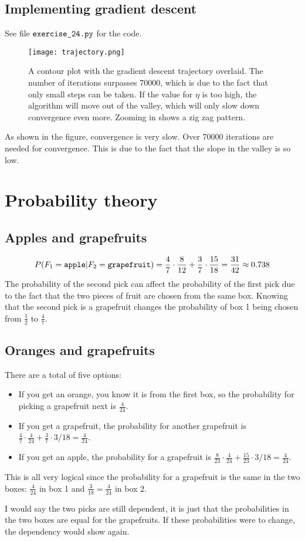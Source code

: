 \documentclass[paper=a4, fontsize=10pt]{scrartcl} %
\numberwithin{equation}{section} %
\numberwithin{figure}{section} %
\numberwithin{table}{section} %
\begin{document}
\subsection{Implementing gradient descent}
See file $\verb|exercise_24.py|$ for the code.

\begin{figure}[H]
	\centering
	\texttt{[image: trajectory.png]}
	\caption{A contour plot with the gradient descent trajectory overlaid. The number of iterations surpasses 70000, which is due to the fact that only small steps can be taken. If the value for $\eta$ is too high, the algorithm will move out of the valley, which will only slow down convergence even more. Zooming in shows a zig zag pattern.}
\end{figure}

As shown in the figure, convergence is very slow. Over 70000 iterations are needed for convergence. This is due to the fact that the slope in the valley is so low. 

\section{Probability theory}
\subsection{Apples and grapefruits}

\begin{equation}
	P(F_1 = \verb|apple| \vert F_2 = \verb|grapefruit|) = \frac{4}{7} \cdot \frac{8}{12} + \frac{3}{7} \cdot \frac{15}{18} = \frac{31}{42} \approx 0.738
\end{equation}
The probability of the second pick can affect the probability of the first pick due to the fact that the two pieces of fruit are chosen from the same box. Knowing that the second pick is a grapefruit changes the probability of box 1 being chosen from $\frac{1}{2}$ to $\frac{4}{7}$.
\subsection{Oranges and grapefruits}
There are a total of five options:
\begin{itemize}
\item If you get an orange, you know it is from the first box, so the probability for picking a grapefruit next is $\frac{4}{24}$.
\item If you get a grapefruit, the probability for another grapefruit is $\frac{4}{7} \cdot \frac{4}{24} + \frac{3}{7} \cdot 3/18 = \frac{4}{24}$.
\item If you get an apple, the probability for a grapefruit is $\frac{8}{23} \cdot \frac{4}{24} + \frac{15}{23} \cdot 3/18 = \frac{4}{24}$.
\end{itemize}
This is all very logical since the probability for a grapefruit is the same in the two boxes: $\frac{4}{24}$ in box 1 and $\frac{3}{18} = \frac{4}{24}$ in box 2.

I would say the two picks are still dependent, it is just that the probabilities in the two boxes are equal for the grapefruits. If these probabilities were to change, the dependency would show again.
\end{document}
